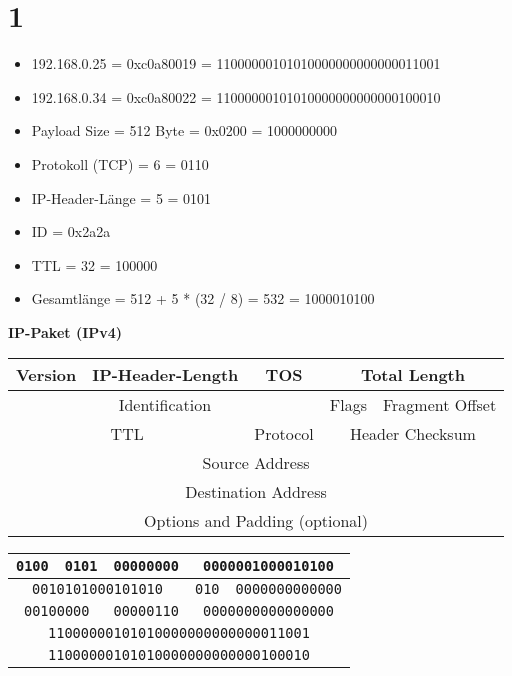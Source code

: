 \documentclass[ngerman]{scrartcl}
\begin{document}
\section*{1}
  \begin{itemize}
    \item 192.168.0.25 = 0xc0a80019 = 11000000101010000000000000011001
    \item 192.168.0.34 = 0xc0a80022 = 11000000101010000000000000100010
    \item Payload Size = 512 Byte = 0x0200 = 1000000000
    \item Protokoll (TCP) = 6 = 0110
    \item IP-Header-Länge = 5 = 0101
    \item ID = 0x2a2a
    \item TTL = 32 = 100000
    \item Gesamtlänge = 512 + 5 * (32 / 8) = 532 = 1000010100
  \end{itemize}

  \textbf{IP-Paket (IPv4)}

	\begin{tabular}{|*{32}{c|}}
    \hline
    \multicolumn{4}{|c|}{Version} & \multicolumn{4}{|c|}{IP-Header-Length}  & \multicolumn{8}{|c|}{TOS} & \multicolumn{16}{|c|}{Total Length} \\
    \hline
    \multicolumn{16}{|c|}{Identification} & \multicolumn{3}{|c|}{Flags} & \multicolumn{13}{|c|}{Fragment Offset}  \\
    \hline
    \multicolumn{8}{|c|}{TTL} & \multicolumn{8}{|c|}{Protocol} & \multicolumn{16}{|c|}{Header Checksum}  \\
    \hline
    \multicolumn{32}{|c|}{Source Address} \\
    \hline
    \multicolumn{32}{|c|}{Destination Address} \\
    \hline
    \multicolumn{32}{|c|}{Options and Padding (optional)} \\
    \hline
	\end{tabular}

	\begin{tabular}{|*{32}{c|}}
    \hline
    \multicolumn{4}{|c|}{\texttt{0100}} & \multicolumn{4}{|c|}{\texttt{0101}}  & \multicolumn{8}{|c|}{\texttt{00000000}} & \multicolumn{16}{|c|}{\texttt{0000001000010100}} \\
    \hline
    \multicolumn{16}{|c|}{\texttt{0010101000101010}} & \multicolumn{3}{|c|}{\texttt{010}} & \multicolumn{13}{|c|}{\texttt{0000000000000}}  \\
    \hline
    \multicolumn{8}{|c|}{\texttt{00100000}} & \multicolumn{8}{|c|}{\texttt{00000110}} & \multicolumn{16}{|c|}{\texttt{0000000000000000}}  \\
    \hline
    \multicolumn{32}{|c|}{\texttt{11000000101010000000000000011001}} \\
    \hline
    \multicolumn{32}{|c|}{\texttt{11000000101010000000000000100010}} \\
    \hline
	\end{tabular}
\end{document}
